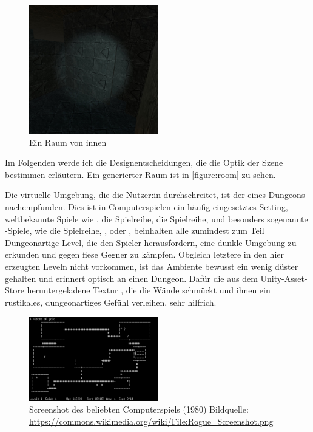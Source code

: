 \begin{figure}[!h]
    \centering
    \includegraphics[width=0.5\textwidth]{vrscreenshots/rauminnen.jpg}
    \caption{Ein Raum von innen}\label{figure:room}
\end{figure}

Im Folgenden werde ich die Designentscheidungen, die die Optik der Szene bestimmen erläutern.
Ein generierter Raum ist in \autoref{figure:room} zu sehen.

Die virtuelle Umgebung, die die Nutzer:in durchschreitet, ist der eines Dungeons nachempfunden. Dies ist in Computerspielen ein häufig eingesetztes Setting, weltbekannte Spiele wie
,
die  Spielreihe,
die  Spielreihe,
und besonders sogenannte -Spiele, wie
die  Spielreihe,
,
oder , beinhalten alle zumindest zum Teil Dungeonartige Level, die den Spieler herausfordern, eine dunkle Umgebung zu erkunden und gegen fiese Gegner zu kämpfen.
Obgleich letztere in den hier erzeugten Leveln nicht vorkommen, ist das  Ambiente bewusst ein wenig düster gehalten und erinnert optisch an einen Dungeon. Dafür die aus dem Unity-Asset-Store heruntergeladene Textur \cite{dungeon-material}, die die Wände schmückt und ihnen ein rustikales, dungeonartiges Gefühl verleihen, sehr hilfrich.

\begin{figure}[!h]
    \centering
    \includegraphics[width=0.5\textwidth]{images/rogue.png}
    \caption{
        Screenshot des beliebten Computerspiels  (1980)
        Bildquelle: \href{https://commons.wikimedia.org/wiki/File:Rogue_Screenshot.png}{https://commons.wikimedia.org/wiki/File:Rogue\_Screenshot.png}
    }
    \label{figure:rogue}
\end{figure}

